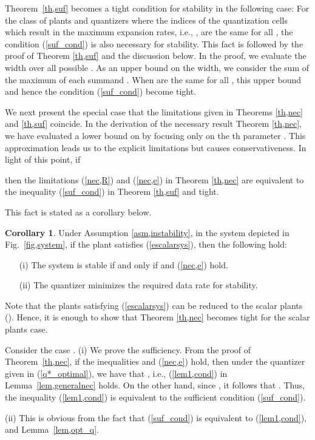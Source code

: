 \documentclass[a4paper, 11pt]{article}
\makeatletter
\theoremstyle{definition}
\newtheorem{cor}{Corollary}
\newenvironment{pf}[1][\proofname]{\par\pushQED{\qed}
 \normalfont\topsep6\p@\@plus6\p@\relax\trivlist\item[\hskip\labelsep\bfseries#1\@addpunct{.}]
 \ignorespaces}{\popQED\endtrivlist\@endpefalse}
\newcommand{\fref}[1]{Fig.~\ref{#1}}
\makeatother
\begin{document}
Theorem~\ref{th,suf} becomes a tight condition for stability in the following
case:
For the class of plants and quantizers where the indices of the quantization
cells which result in the maximum expansion rates, i.e., ,
are the same for all , the condition (\ref{suf_cond}) is
also necessary for stability.
This fact is followed by the proof of Theorem \ref{th,suf} and
the discussion below.
In the proof, we evaluate the width 
over all possible .
As an upper bound on the width, we consider the sum of the
maximum  of each summand .
When  are the same for all , this upper bound
and hence the condition (\ref{suf_cond}) become tight.


We next present the special case that the limitations given in Theorems
\ref{th,nec} and \ref{th,suf} coincide.
In the derivation of the necessary result Theorem \ref{th,nec},
we have evaluated a lower bound on  by focusing only on
the th parameter .
This approximation leads us to the explicit limitations but causes conservativeness.
In light of this point, if

then the limitations (\ref{nec,R}) and (\ref{nec,e}) in Theorem \ref{th,nec}
are equivalent to the inequality (\ref{suf_cond}) in Theorem \ref{th,suf} and tight.

This fact is stated as a corollary below.
\begin{cor}\label{cor,scalar}
 Under Assumption \ref{asm,instability}, in the system depicted in \fref{fig,system},
if the plant satisfies (\ref{escalarsys}), then the following hold:
\begin{itemize}
 \item[(i)]  The system is stable if and only if  
	     and (\ref{nec,e}) hold.
\item[(ii)] The quantizer  minimizes the required data rate for
stability.
\end{itemize}
\end{cor}

Note that the plants satisfying (\ref{escalarsys}) can be reduced to the scalar
plants ().
Hence, it is enough to show that Theorem \ref{th,nec} becomes tight
for the scalar plants case.

\begin{pf}
Consider the case .
(i) We prove the sufficiency.
From the proof of Theorem~\ref{th,nec}, if the inequalities 
and (\ref{nec,e}) hold, then under the quantizer  given in (\ref{q*_optimal}),
we have that , i.e., (\ref{lem1,cond}) in Lemma~\ref{lem,generalnec}
holds.
On the other hand, since , it follows that .
Thus, the inequality (\ref{lem1,cond}) is equivalent to the sufficient condition
(\ref{suf_cond}).

(ii) This is obvious from the fact that (\ref{suf_cond}) is equivalent
to (\ref{lem1,cond}), and Lemma~\ref{lem,opt_q}.
\end{pf}
\end{document}
